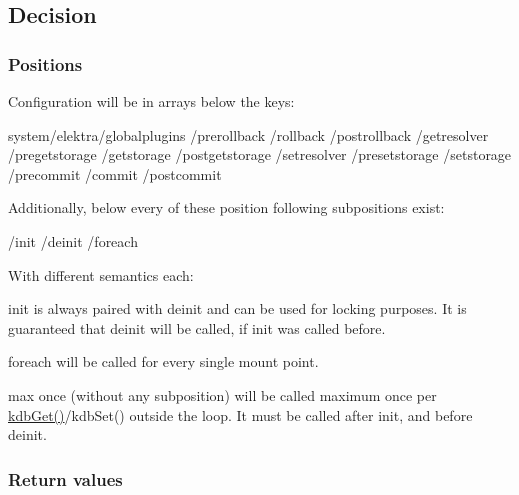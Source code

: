 \subsection*{Decision}

\subsubsection*{Positions}

Configuration will be in arrays below the keys\+: \begin{DoxyVerb}system/elektra/globalplugins
                             /prerollback
                             /rollback
                             /postrollback
                             /getresolver
                             /pregetstorage
                             /getstorage
                             /postgetstorage
                             /setresolver
                             /presetstorage
                             /setstorage
                             /precommit
                             /commit
                             /postcommit
\end{DoxyVerb}


Additionally, below every of these position following subpositions exist\+: \begin{DoxyVerb}                                        /init
                                        /deinit
                                        /foreach
\end{DoxyVerb}


With different semantics each\+:


\begin{DoxyItemize}
\item {\ttfamily init} is always paired with {\ttfamily deinit} and can be used for locking purposes. It is guaranteed that {\ttfamily deinit} will be called, if {\ttfamily init} was called before.
\item {\ttfamily foreach} will be called for every single mount point.
\item {\ttfamily max once} (without any subposition) will be called maximum once per {\ttfamily \hyperlink{group__kdb_ga28e385fd9cb7ccfe0b2f1ed2f62453a1}{kdb\+Get()}/kdb\+Set()} outside the loop. It must be called after {\ttfamily init}, and before {\ttfamily deinit}.
\end{DoxyItemize}

\subsubsection*{Return values}

